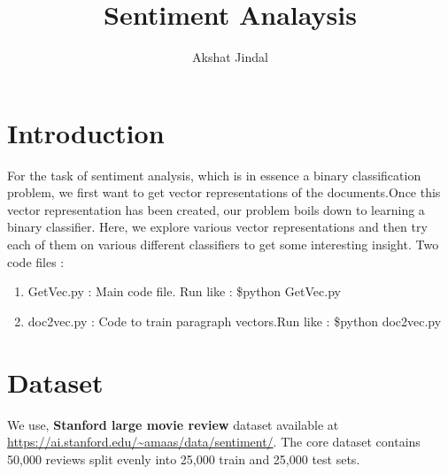 \documentclass{article}
\title{Sentiment Analaysis}
\author{Akshat Jindal}
\begin{document}
\maketitle

\section{Introduction}
For the task of sentiment analysis, which is in essence a binary classification problem, we first want to get vector representations of the documents.Once this vector representation has been created, our problem boils down to learning a binary classifier. Here, we explore various vector representations and then try each of them on various different classifiers to get some interesting insight. Two code files :
\begin{enumerate}
    \item GetVec.py : Main code file. Run like :  \$python GetVec.py
    \item doc2vec.py : Code to train paragraph vectors.Run like :  \$python doc2vec.py
\end{enumerate}

\section{Dataset}

We use, \textbf{Stanford large movie review} dataset available at \url{https://ai.stanford.edu/~amaas/data/sentiment/}.
The core dataset contains 50,000 reviews split evenly into 25,000 train and 25,000 test sets. 
\end{document}
